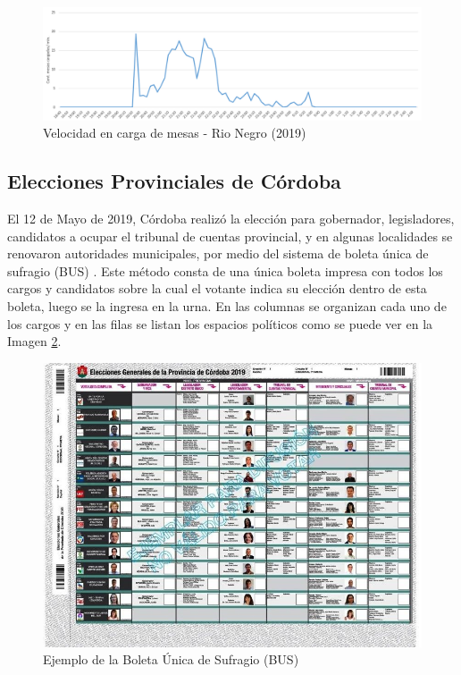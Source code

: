 \begin{figure}[h!]
  \includegraphics[width=1\textwidth]{img/8w25IVQD5U.png}
  \caption{Velocidad en carga de mesas - Rio Negro (2019)}
  \label{graf:velocidadRioNegro}
\end{figure}

\subsection{Elecciones Provinciales de Córdoba}
El 12 de Mayo de 2019, Córdoba realizó la elección para gobernador, legisladores,  candidatos a ocupar el tribunal de cuentas provincial, y en algunas localidades se renovaron autoridades municipales, por medio del sistema de boleta única de sufragio (BUS) \cite{cortiboleta}. Este método consta de una única boleta impresa con todos los cargos y candidatos 
sobre la cual el votante indica su elección dentro de esta boleta, luego 
se la ingresa en la urna. En las columnas se organizan cada uno de los cargos y en las filas se listan los espacios políticos como se puede ver en la Imagen \ref{graf:BUSCordoba}.
\begin{figure}[h!]
  \includegraphics[width=1\textwidth]{img/boletaunica-cordoba.jpg}
  \caption{Ejemplo de la Boleta Única de Sufragio (BUS)}
  \label{graf:BUSCordoba}
\end{figure}
